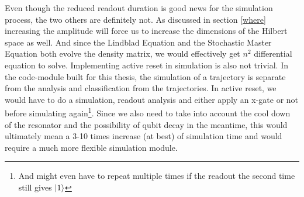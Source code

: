 Even though the reduced readout duration is good news for the simulation process, the two others are definitely not. As discussed in section \ref{where} increasing the amplitude will force us to increase the dimensions of the Hilbert space as well. And since the Lindblad Equation and the Stochastic Master Equation both evolve the density matrix, we would effectively get $n^2$ differential equation to solve. Implementing active reset in simulation is also not trivial. In the code-module built for this thesis, the simulation of a trajectory is separate from the analysis and classification from the trajectories. In active reset, we would have to do a simulation, readout analysis and either apply an x-gate or not before simulating again\footnote{And might even have to repeat multiple times if the readout the second time still gives $\ket{1}$}. Since we also need to take into account the cool down of the resonator and the possibility of qubit decay in the meantime, this would ultimately mean a 3-10 times increase  (at best)  of simulation time and would require a much more flexible simulation module.